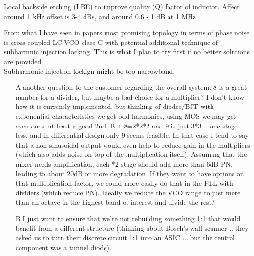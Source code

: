 \documentclass{article}
\begin{document}
\begin{question}
	Local backside etching (LBE) to improve quality (Q) factor of inductor. Affect around 1 kHz offset is 3-4 dBs, and around 0.6 - 1 dB at 1 MHz .
\end{question}

\begin{info}
	From what I have seen in papers  most promising topology in terms of phase noise is cross-coupled LC VCO class C with potential additional technique of subharmnic injection locking. This is what I plan to try first if no better solutions are provided. \\
	Subharmonic injection lockign might be too narrowband. %
\end{info}


\begin{itemize}

	\item [A] another question to the customer regarding the overall system. 8 is a great number for a divider, but maybe a bad choice for a multiplier? I don't know how it is currently implemented, but thinking of diodes/BJT with exponential characteristics we get odd harmonics, using MOS we may get even ones, at least a good 2nd. But 8=2*2*2 and 9 is just 3*3 .. one stage less, and in differential design only 9 seems feasible. In that case I tend to say that a non-sinusoidal output would even help to reduce gain in the multipliers (which also adds noise on top of the multiplication itself). Assuming that the mixer needs amplification, each *2 stage should add more than 6dB PN, leading to about 20dB or more degradation. If they want to have options on that multiplication factor, we could more easily do that in the PLL with dividers (which reduce PN). Ideally we reduce the VCO range to just more than an octave in the highest band of interest and divide the rest?

	\item [B] I just want to ensure that we're not rebuilding something 1:1 that would benefit from a different structure (thinking about Bosch's wall scanner .. they asked us to turn their discrete circuit 1:1 into an ASIC ... but the central component was a tunnel diode).

\end{itemize}
\end{document}
